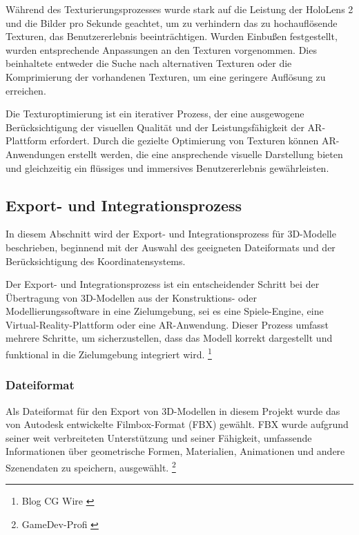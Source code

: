 Während des Texturierungsprozesses wurde stark auf die Leistung der HoloLens 2 und die Bilder pro Sekunde geachtet, um zu verhindern das zu hochauflösende Texturen, das Benutzererlebnis beeinträchtigen. Wurden Einbußen festgestellt, wurden entsprechende Anpassungen an den Texturen vorgenommen. Dies beinhaltete entweder die Suche nach alternativen Texturen oder die Komprimierung der vorhandenen Texturen, um eine geringere Auflösung zu erreichen.

Die Texturoptimierung ist ein iterativer Prozess, der eine ausgewogene Berücksichtigung der visuellen Qualität und der Leistungsfähigkeit der AR-Plattform erfordert. Durch die gezielte Optimierung von Texturen können AR-Anwendungen erstellt werden, die eine ansprechende visuelle Darstellung bieten und gleichzeitig ein flüssiges und immersives Benutzererlebnis gewährleisten.

\subsection{Export- und Integrationsprozess}
In diesem Abschnitt wird der Export- und Integrationsprozess für 3D-Modelle beschrieben, beginnend mit der Auswahl des geeigneten Dateiformats und der Berücksichtigung des Koordinatensystems.

Der Export- und Integrationsprozess ist ein entscheidender Schritt bei der Übertragung von 3D-Modellen aus der Konstruktions- oder Modellierungssoftware in eine Zielumgebung, sei es eine Spiele-Engine, eine Virtual-Reality-Plattform oder eine AR-Anwendung. Dieser Prozess umfasst mehrere Schritte, um sicherzustellen, dass das Modell korrekt dargestellt und funktional in die Zielumgebung integriert wird. \footnote{Blog CG Wire \cite {Getting started with export in Blender}}

\subsubsection{Dateiformat}
Als Dateiformat für den Export von 3D-Modellen in diesem Projekt wurde das von Autodesk entwickelte Filmbox-Format (FBX) gewählt. FBX wurde aufgrund seiner weit verbreiteten Unterstützung und seiner Fähigkeit, umfassende Informationen über geometrische Formen, Materialien, Animationen und andere Szenendaten zu speichern, ausgewählt. \footnote{GameDev-Profi \cite{Welches Dateiformat}}

